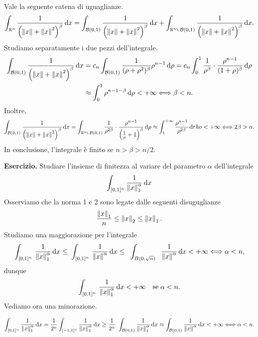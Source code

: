 \documentclass[a4paper, 12pt]{report}
\begin{document}
Vale la seguente catena di uguaglianze.
%
$$
\int_{\R^n}^{} \frac{1}{\left( \norm{ x } + \norm{ x }^2 \right)^\beta} \dd x 
= \int_{\mathcal{B}(0,1)}^{} \frac{1}{\left( \norm{ x } + \norm{ x }^2 \right)^\beta} \dd x 
+ \int_{\R^n \setminus \; \mathcal{B}(0,1)}^{} \frac{1}{\left( \norm{ x } + \norm{ x }^2 \right)^\beta} \dd x.
$$
%
Studiamo separatamente i due pezzi dell'integrale.
%
\begin{align*}
	\int_{\mathcal{B}(0,1)}^{} \frac{1}{\left( \left\lVert  x  \right\rVert + \left\lVert  x  \right\rVert^2 \right)^\beta} \,\mathrm{d} x 
	& = c_n \int_{\mathcal{B}(0,1)}^{} \frac{1}{(\rho + \rho^2)^\beta} \rho^{n-1} \,\mathrm{d} \rho
	= c_n \int_{0}^{1} \frac{1}{\rho^\beta} \cdot \frac{\rho^{n-1}}{(1 + \rho)^\beta} \,\mathrm{d} \rho \\
	& \approx \int_{0}^{1} \rho^{n-1-\beta} \,\mathrm{d} \rho < + \infty \Longleftrightarrow  \beta < n.
\end{align*}
%
Inoltre,
%
$$
	\int_{\mathcal{B}(0,1)}^{} \frac{1}{\left( \norm{ x } + \norm{ x }^2 \right)^\beta} \dd x 
	= \int_{\R^n \setminus \; \mathcal{B}(0,1)}^{} \frac{1}{\rho^{2\beta}} \cdot \frac{\rho^{n-1}}{\left( \frac{1}{\rho} + 1 \right)^\beta} \dd \rho 
	\approx \int_{1}^{+\infty} \frac{\rho^{n-1}}{\rho^{2\beta}} \dd rho < + \infty \longiff 2\beta > \alpha.  
$$
%
In conclusione, l'integrale è finito se $n > \beta > n / 2$.


\textbf{Esercizio.}
Studiare l'insieme di finitezza al variare del parametro $\alpha$ dell'integrale
$$
	\int_{[0,1]^n}^{} \frac{1}{\left\lVert  x  \right\rVert_1^\alpha} \,\mathrm{d} x 
$$
Osserviamo che la norma 1 e 2 sono legate dalle seguenti disuguglianze
$$
	\frac{\left\lVert  x  \right\rVert_1}{n} \leq \left\lVert  x  \right\rVert_2 \leq \left\lVert  x  \right\rVert_1.
$$
%
Studiamo una maggiorazione per l'integrale
%
$$
	\int_{[0,1]^n}^{} \, \frac{1}{\left\lVert  x  \right\rVert_1^\alpha} \,\mathrm{d} x 
	\leq \;\int_{[0,1]^n}^{} \, \frac{1}{\left\lVert  x  \right\rVert^\alpha} \,\mathrm{d} x 
	\leq \;\;\int_{B(0,\sqrt{n})}^{}\;\; \frac{1}{\left\lVert  x  \right\rVert^\alpha} \,\mathrm{d} x < + \infty \Longleftrightarrow \alpha < n,
$$
%
dunque
%
$$
\int_{[0,1]^n}^{} \, \frac{1}{\left\lVert  x  \right\rVert_1^\alpha} \,\mathrm{d} x < +\infty \quad \text{se} \; \alpha < n.
$$
%
Vediamo ora una minorazione.

$$
	\int_{[0,1]^n}^{} \frac{1}{\left\lVert  x  \right\rVert_1^\alpha} \,\mathrm{d} x 
= \frac{1}{2^n}	\int_{[-1,1]^n}^{} \frac{1}{\left\lVert  x  \right\rVert_1^\alpha} \,\mathrm{d} x 
\geq \frac{1}{2^n} \ \int_{\mathcal{B}(0,1)}^{} \frac{1}{\left\lVert  x  \right\rVert_1^\alpha} \,\mathrm{d} x 
\approx \int_{\mathcal{B}(0,1)}^{} \frac{1}{\left\lVert  x  \right\rVert^\alpha} \,\mathrm{d} x < + \infty 
\Longleftrightarrow \alpha < n.
$$
\end{document}
